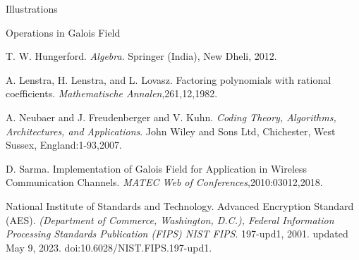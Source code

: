 \begin{frame}[allowframebreaks]{Illustrations}
\begin{frame}{Operations in Galois Field}
\begin{thebibliography}{9}
    T. W. Hungerford. \emph{Algebra}. Springer (India), New Dheli, 2012.

    A. Lenstra, H. Lenstra, and L. Lovasz. Factoring polynomials with rational coefficients. \emph{Mathematische Annalen},261,12,1982.

    A. Neubaer and J. Freudenberger and V. Kuhn. \emph{Coding Theory, Algorithms, Architectures, and Applications}. John Wiley and Sons Ltd, Chichester, West Sussex, England:1-93,2007.

    D. Sarma. Implementation of Galois Field for Application in Wireless Communication Channels. \emph{MATEC Web of Conferences},2010:03012,2018.

    National Institute of Standards and Technology. Advanced Encryption
    Standard (AES). \emph{(Department of Commerce, Washington, D.C.), Federal Information Processing Standards Publication (FIPS) NIST FIPS}. 197-upd1, 2001. updated May 9, 2023. doi:10.6028/NIST.FIPS.197-upd1.
  \end{thebibliography}
\end{frame}
\end{frame}


